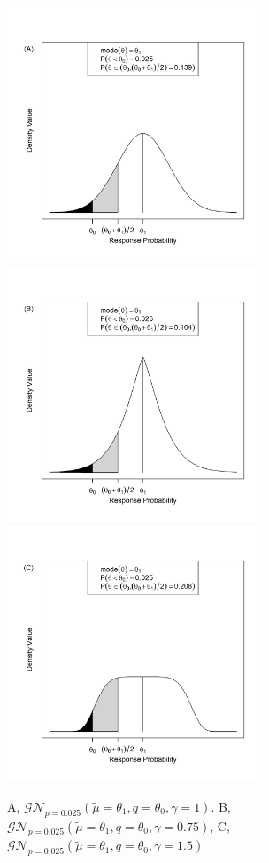 \documentclass[useAMS,usenatbib,referee]{biom}
\begin{document}
\begin{figure}
\begin{center}
\includegraphics[width=3in]{figure1a.png}
\includegraphics[width=3in]{figure1b.png}
\includegraphics[width=3in]{figure1c.png}
\caption{A, $\mathcal{GN}_{p=0.025}(\tilde{\mu}=\theta_1,q=\theta_0,\gamma=1)$. B, $\mathcal{GN}_{p=0.025}(\tilde{\mu}=\theta_1,q=\theta_0,\gamma=0.75)$, C, $\mathcal{GN}_{p=0.025}(\tilde{\mu}=\theta_1,q=\theta_0,\gamma=1.5)$}
\label{fig:figure1}
\end{center}
\end{figure}
\end{document}
